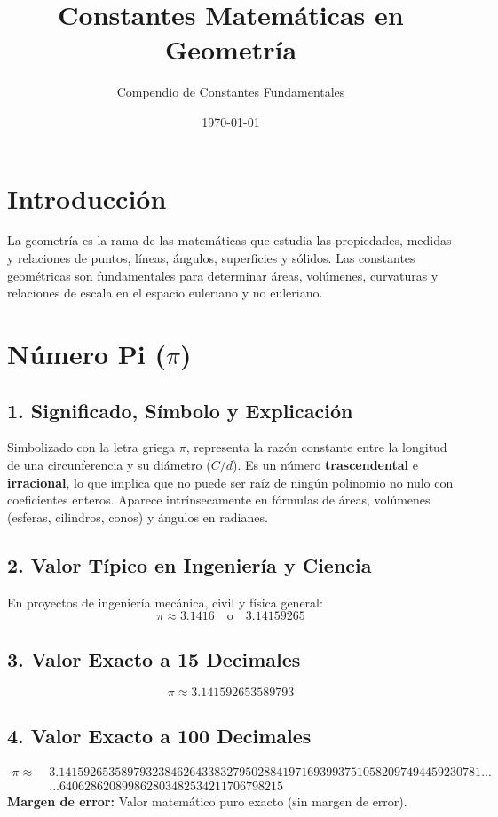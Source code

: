 \documentclass[12pt,a4paper]{article}
\title{\textbf{Constantes Matemáticas en Geometría}}
\author{Compendio de Constantes Fundamentales}
\date{\today}
\begin{document}
\maketitle

\section*{Introducción}
La geometría es la rama de las matemáticas que estudia las propiedades, medidas y relaciones de puntos, líneas, ángulos, superficies y sólidos. Las constantes geométricas son fundamentales para determinar áreas, volúmenes, curvaturas y relaciones de escala en el espacio euleriano y no euleriano.

\section{Número Pi ($\pi$)}

\subsection*{1. Significado, Símbolo y Explicación}
Simbolizado con la letra griega $\pi$, representa la razón constante entre la longitud de una circunferencia y su diámetro ($C/d$). Es un número \textbf{trascendental} e \textbf{irracional}, lo que implica que no puede ser raíz de ningún polinomio no nulo con coeficientes enteros. Aparece intrínsecamente en fórmulas de áreas, volúmenes (esferas, cilindros, conos) y ángulos en radianes.

\subsection*{2. Valor Típico en Ingeniería y Ciencia}
En proyectos de ingeniería mecánica, civil y física general:
\begin{equation*}
\pi \approx 3.1416 \quad \text{o} \quad 3.14159265
\end{equation*}

\subsection*{3. Valor Exacto a 15 Decimales}
\begin{equation*}
\pi \approx 3.141592653589793
\end{equation*}

\subsection*{4. Valor Exacto a 100 Decimales}
\begin{align*}
\pi \approx \; & 3.14159265358979323846264338327950288419716939937510582097494459230781... \\
& ...640628620899862803482534211706798215
\end{align*}
\textbf{Margen de error:} Valor matemático puro exacto (sin margen de error).
\end{document}
